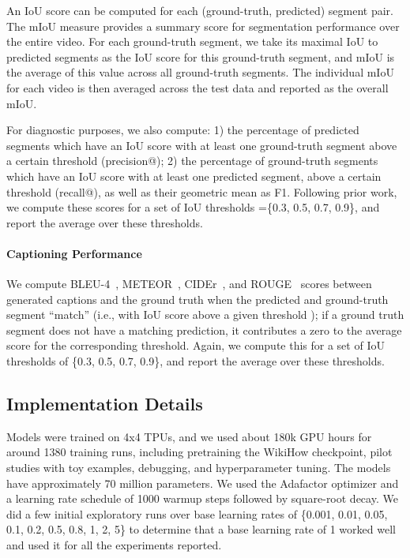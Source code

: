 \documentclass[11pt]{article}
\begin{document}
An IoU score can be computed for each (ground-truth, predicted) segment pair.
The mIoU measure provides a summary score for segmentation performance over the entire video. For each ground-truth segment, we take its maximal IoU to predicted segments as the IoU score for this ground-truth segment, and mIoU is the average of this value across all ground-truth segments.
The individual mIoU for each video is then averaged across the test data and reported as the overall mIoU.

For diagnostic purposes, we also compute: 1) the percentage of predicted segments which have an IoU score with at least one ground-truth segment above a certain threshold   (precision@); 2) the percentage of ground-truth segments which have an IoU score with at least one predicted segment, above a certain threshold  (recall@), as well as their geometric mean as F1. Following prior work, we compute these scores for a set of IoU thresholds =\{0.3, 0.5, 0.7, 0.9\}, and report the average over these thresholds.



\paragraph{Captioning Performance}
We compute BLEU-4~\citep{Papineni2002BleuAM}, METEOR~\citep{Banerjee2005METEORAA}, CIDEr~\citep{Vedantam2015CIDErCI}, and ROUGE~\citep{Lin2004ROUGEAP} scores between generated captions and the ground truth when the predicted and ground-truth segment ``match'' (i.e., with IoU score above a given threshold ); if a ground truth segment does not have a matching prediction, it contributes a zero to the average score for the corresponding threshold. Again, we compute this for a set of IoU thresholds of \{0.3, 0.5, 0.7, 0.9\}, and report the average over these thresholds.


\subsection{Implementation Details}
Models were trained on 4x4 TPUs, and we used about 180k GPU hours for around 1380 training runs, including pretraining the WikiHow checkpoint, pilot studies with toy examples, debugging, and hyperparameter tuning. The models have approximately 70 million parameters. 
We used the Adafactor \cite{shazeer:18} optimizer and a learning rate schedule of 1000 warmup steps followed by square-root decay. We did a few initial exploratory runs over base learning rates of \{0.001, 0.01, 0.05, 0.1, 0.2, 0.5, 0.8, 1, 2, 5\} to determine that a base learning rate of 1 worked well and used it for all the experiments reported.
\end{document}
